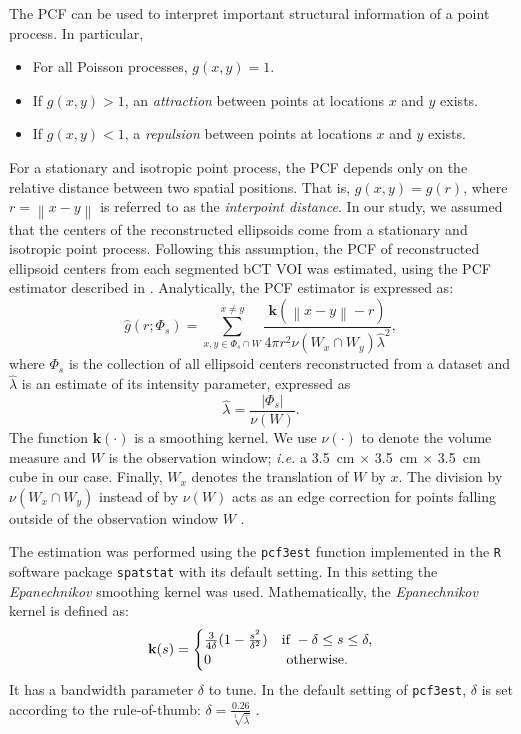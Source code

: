 \documentclass[journal]{IEEEtran}
\newcommand{\norm}[1]{\left\lVert#1\right\rVert}%
\begin{document}
The PCF can be used to interpret important structural information of a
point process. In particular,
\begin{itemize}
\item For all Poisson processes, $g(x,y)=1$.
\item If $g(x,y)>1$, an \textit{attraction} between points at
  locations $x$ and $y$ exists.
\item If $g(x,y)<1$, a \textit{repulsion} between points at locations
  $x$ and $y$ exists.
\end{itemize}

For a stationary and isotropic point process, the PCF depends only on
the relative distance between two spatial positions. That is,
$g(x, y) = g(r)$, where $r = \norm{x-y}$ is referred to as the
\textit{interpoint distance}. In our study, we assumed that the
centers of the reconstructed ellipsoids come from a stationary and
isotropic point process. Following this assumption, the PCF of
reconstructed ellipsoid centers from each segmented bCT VOI was
estimated, using the PCF estimator described in
\cite[p232]{illian2008statistical}. Analytically, the PCF estimator is
expressed as:
\begin{equation}
  \label{eq:pcf-estimator}
  \hat{g}(r; \Phi_s) = \sum^{x \neq y}_{x, y \in \Phi_s \cap W}
  \frac{\mathbf{k}(\norm{x-y} - r)}
  {4 \pi r^2 \nu(W_x \cap W_y) \hat{\lambda}^2},
\end{equation}
where $\Phi_s$ is the collection of all ellipsoid centers
reconstructed from a dataset and $\hat{\lambda}$ is an estimate of its
intensity parameter, expressed as
\begin{equation}
  \label{eq:inten-estimtor}
  \hat{\lambda} = \frac{|\Phi_s|}{\nu(W)}.
\end{equation}
The function $\mathbf{k}(\cdot)$ is a smoothing kernel. We use
$\nu(\cdot)$ to denote the volume measure and $W$ is the observation
window; \textit{i.e.} a \SI{3.5}{\cm} $\times$ \SI{3.5}{\cm} $\times$
\SI{3.5}{\cm} cube in our case. Finally, $W_x$ denotes the translation
of $W$ by $x$. The division by $\nu(W_x \cap W_y)$ instead of by
$\nu(W)$ acts as an edge correction for points falling outside of the
observation window $W$ \cite{ohser1983estimators}.

The estimation was performed using the \texttt{pcf3est} function
implemented in the \texttt{R} software package \texttt{spatstat}
\cite{baddeley2005spatstat} with its default setting. In this setting
the \textit{Epanechnikov} smoothing kernel \cite{chiu2013stochastic}
was used. Mathematically, the \textit{Epanechnikov} kernel is defined
as:
\begin{equation}
  \label{eq:epan-kernel}
  \mathbf{k}(s) =
  \begin{cases}
    \frac{3}{4\delta} (1 - \frac{s^2}{\delta^2}) & \textnormal{if }
    -\delta \leq s \leq \delta, \\
    0 & \textnormal{ otherwise}.
  \end{cases}
\end{equation}
It has a bandwidth parameter $\delta$ to tune. In the default setting
of \texttt{pcf3est}, $\delta$ is set according to the rule-of-thumb:
$\delta = \frac{0.26}{\sqrt[3]{\hat{\lambda}}}$
\cite{baddeley2005spatstat}.
\end{document}
